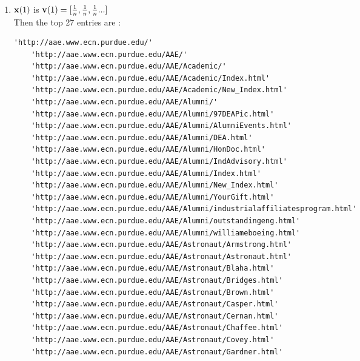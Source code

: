 \documentclass{article}
\begin{document}
\begin{enumerate}
\item 
$\boldsymbol{\mathrm{x}}(1)$ is $\boldsymbol{\mathrm{v}}(1)=[\frac{1}{n}, \frac{1}{n}, \frac{1}{n}... ]$ \\
Then the top 27 entries are : 
\begin{verbatim}
'http://aae.www.ecn.purdue.edu/'
    'http://aae.www.ecn.purdue.edu/AAE/'
    'http://aae.www.ecn.purdue.edu/AAE/Academic/'
    'http://aae.www.ecn.purdue.edu/AAE/Academic/Index.html'
    'http://aae.www.ecn.purdue.edu/AAE/Academic/New_Index.html'
    'http://aae.www.ecn.purdue.edu/AAE/Alumni/'
    'http://aae.www.ecn.purdue.edu/AAE/Alumni/97DEAPic.html'
    'http://aae.www.ecn.purdue.edu/AAE/Alumni/AlumniEvents.html'
    'http://aae.www.ecn.purdue.edu/AAE/Alumni/DEA.html'
    'http://aae.www.ecn.purdue.edu/AAE/Alumni/HonDoc.html'
    'http://aae.www.ecn.purdue.edu/AAE/Alumni/IndAdvisory.html'
    'http://aae.www.ecn.purdue.edu/AAE/Alumni/Index.html'
    'http://aae.www.ecn.purdue.edu/AAE/Alumni/New_Index.html'
    'http://aae.www.ecn.purdue.edu/AAE/Alumni/YourGift.html'
    'http://aae.www.ecn.purdue.edu/AAE/Alumni/industrialaffiliatesprogram.html'
    'http://aae.www.ecn.purdue.edu/AAE/Alumni/outstandingeng.html'
    'http://aae.www.ecn.purdue.edu/AAE/Alumni/williameboeing.html'
    'http://aae.www.ecn.purdue.edu/AAE/Astronaut/Armstrong.html'
    'http://aae.www.ecn.purdue.edu/AAE/Astronaut/Astronaut.html'
    'http://aae.www.ecn.purdue.edu/AAE/Astronaut/Blaha.html'
    'http://aae.www.ecn.purdue.edu/AAE/Astronaut/Bridges.html'
    'http://aae.www.ecn.purdue.edu/AAE/Astronaut/Brown.html'
    'http://aae.www.ecn.purdue.edu/AAE/Astronaut/Casper.html'
    'http://aae.www.ecn.purdue.edu/AAE/Astronaut/Cernan.html'
    'http://aae.www.ecn.purdue.edu/AAE/Astronaut/Chaffee.html'
    'http://aae.www.ecn.purdue.edu/AAE/Astronaut/Covey.html'
    'http://aae.www.ecn.purdue.edu/AAE/Astronaut/Gardner.html'
\end{verbatim}
\end{enumerate} 
\end{document}

